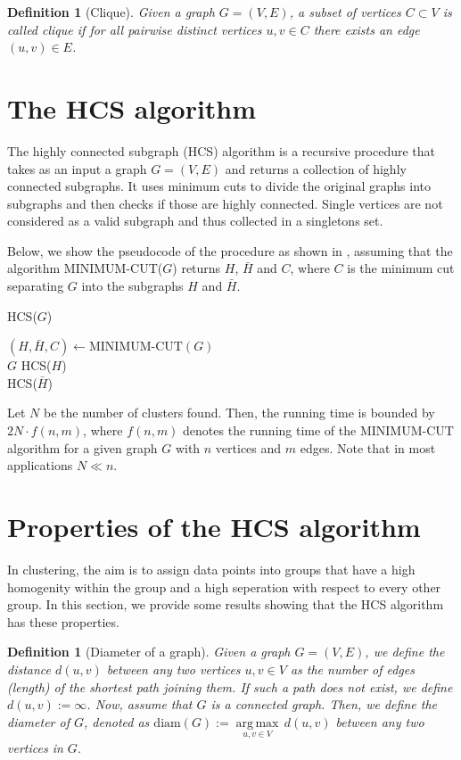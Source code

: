 \documentclass[paper=a4,fontsize=11pt,DIV=8,BCOR=5mm,twoside,pdftex,bibtotocnumbered]{scrreprt}
\newcommand{\diam}{\text{diam}}
\DeclareMathOperator*{\argmax}{arg\,max}
\theoremstyle{plain}
\newtheorem{definition}[proposition]{Definition}
\begin{document}
\begin{definition}[Clique]
	Given a graph $G=(V,E)$, a subset of vertices $C \subset V$ is called \emph{clique} if for all pairwise distinct vertices $u, v \in C$ there exists an edge $(u,v) \in E$.
\end{definition}

\section{The HCS algorithm}\label{sec:hcs}
The highly connected subgraph (HCS) algorithm is a recursive procedure that takes as an input a graph $G=(V,E)$ and returns a collection of highly connected subgraphs. It uses minimum cuts to divide the original graphs into subgraphs and then checks if those are highly connected. Single vertices are not considered as a valid subgraph and thus collected in a singletons set. 

Below, we show the pseudocode of the procedure as shown in \cite{Hartuv2000}, assuming that the algorithm MINIMUM-CUT($G$) returns $H$, $\bar{H}$ and $C$, where $C$ is the minimum cut separating $G$ into the subgraphs $H$ and $\bar{H}$.

\begin{algorithm}
	\caption{HCS($G$)}\label{alg:hcs}
		$(H, \bar{H}, C) \gets \text{MINIMUM-CUT}(G)$\\
			{\Return $G$}
			{ 
			HCS($H$)\\
			HCS($\bar{H}$)}
\end{algorithm}

Let $N$ be the number of clusters found. Then, the running time is bounded by $2N \cdot f(n,m)$, where $f(n,m)$ denotes the running time of the MINIMUM-CUT algorithm for a given graph $G$ with $n$ vertices and $m$ edges. Note that in most applications $N \ll n$.

\section{Properties of the HCS algorithm}\label{sec:properties_HCS}
In clustering, the aim is to assign data points into groups that have a high homogenity within the group and a high seperation with respect to every other group. In this section, we provide some results showing that the HCS algorithm has these properties.

\begin{definition}[Diameter of a graph]
	Given a graph $G = (V,E)$, we define the \emph{distance} $d(u,v)$ between any two vertices $u, v \in V$ as the number of edges (length) of the shortest path joining them. If such a path does not exist, we define $d(u,v) := \infty$. Now, assume that $G$ is a connected graph. Then, we define the \emph{diameter} of $G$, denoted as $\diam(G) :=\underset{u,v \in V}{\argmax} \,d(u,v)$ between any two vertices in $G$.
\end{definition}
\end{document}
